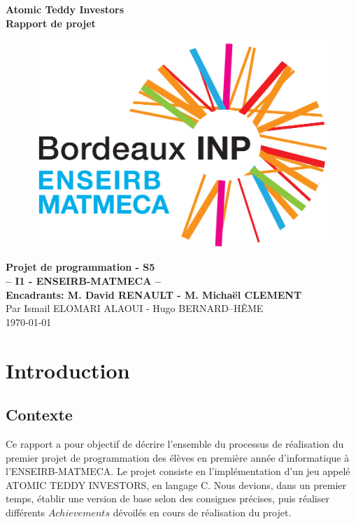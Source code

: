 \documentclass{article}
\begin{document}
\begin {titlepage}
  \begin{center}
      \vspace*{1cm}
    \Large{\textbf{Atomic Teddy Investors}}\\
    \Large{\textbf{Rapport de projet}}
    \vfill
    \begin{figure}[h]
        \centering
        \includegraphics[scale=0.5]{MATMECA.PNG}
    \end{figure}
    \vfill    
    
    \huge{\textbf{Projet de programmation - S5}}\\[3mm]
    \Large{\textbf{-- I1 - ENSEIRB-MATMECA --}}\\[1mm]
    \Large{\textbf{Encadrants: M. David RENAULT - M. Micha\"el CLEMENT }}\\[1mm]    
    \vfill
    Par Ismail ELOMARI ALAOUI - Hugo BERNARD--HÊME\\
    \today\\
  \end{center}
\end{titlepage}



 \tableofcontents
\clearpage
\newpage

\section*{Introduction}
    \subsection*{Contexte}
    Ce rapport a pour objectif de décrire l’ensemble du processus de réalisation du premier projet de programmation des élèves en première année d’informatique à l’ENSEIRB-MATMECA. Le projet consiste en l’implémentation d'un jeu appelé ATOMIC TEDDY INVESTORS, en langage C. Nous devions, dans un premier temps, établir une version de base selon des consignes précises, puis réaliser différents $Achievements$ dévoilés en cours de réalisation du projet.
\end{document}
